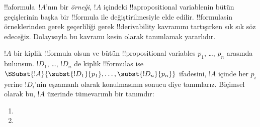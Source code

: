 \documentclass[../../../include/open-logic-section]{subfiles}
\begin{document}


!!a{formula}~$!A$'nın bir \emph{örneği}, $!A$ içindeki
!!a{propositional variable}{}nin bütün geçişlerinin başka bir !!{formula} ile
değiştirilmesiyle elde edilir. !!{formula}s{}in örneklerinden gerek geçerliliği
gerek !!{derivability} kavramını tartışırken sık sık söz edeceğiz.
Dolayısıyla bu kavramı kesin olarak tanımlamak yararlıdır.

\begin{defn}
  $!A$ bir kiplik !!{formula} olsun ve bütün !!{propositional variable}s
  $p_1$, \dots, $p_n$ arasında bulunsun. $!D_1$, \dots, $!D_n$ de kiplik
  !!{formula}s ise
  $\SSubst{!A}{\subst{!D_1}{p_1}, \dots, \subst{!D_n}{p_n}}$ ifadesini,
  $!A$ içinde her $p_i$ yerine $!D_i$'nin eşzamanlı olarak konulmasının
  sonucu diye tanımlarız. Biçimsel olarak bu, $!A$ üzerinde tümevarımlı bir
  tanımdır:
  \begin{enumerate}
    \item {}
    \item {}
\end{enumerate}
\end{defn}
\end{document}
